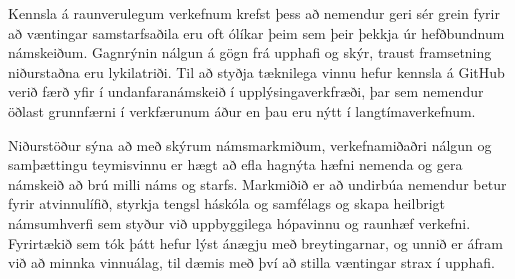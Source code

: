 \documentclass{article}
\begin{document}
Kennsla á raunverulegum verkefnum krefst þess að nemendur geri sér grein fyrir að væntingar samstarfsaðila eru oft ólíkar þeim sem þeir þekkja úr hefðbundnum námskeiðum. Gagnrýnin nálgun á gögn frá upphafi og skýr, traust framsetning niðurstaðna eru lykilatriði. Til að styðja tæknilega vinnu hefur kennsla á GitHub verið færð yfir í undanfaranámskeið í upplýsingaverkfræði, þar sem nemendur öðlast grunnfærni í verkfærunum áður en þau eru nýtt í langtímaverkefnum.

Niðurstöður sýna að með skýrum námsmarkmiðum, verkefnamiðaðri nálgun og samþættingu teymisvinnu er hægt að efla hagnýta hæfni nemenda og gera námskeið að brú milli náms og starfs. Markmiðið er að undirbúa nemendur betur fyrir atvinnulífið, styrkja tengsl háskóla og samfélags og skapa heilbrigt námsumhverfi sem styður við uppbyggilega hópavinnu og raunhæf verkefni. Fyrirtækið sem tók þátt hefur lýst ánægju með breytingarnar, og unnið er áfram við að minnka vinnuálag, til dæmis með því að stilla væntingar strax í upphafi.

\medskip

  
  
\end{document}
